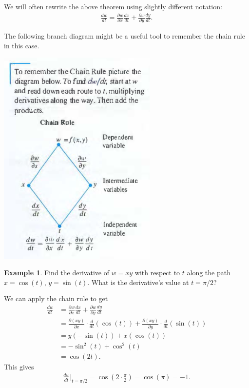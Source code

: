\documentclass[12pt, letter]{article}
\theoremstyle{plain}
\numberwithin{theorem}{section}
\theoremstyle{definition}
\newtheorem{example}[theorem]{Example}
\begin{document}
\bigskip

We will often rewrite the above theorem using slightly different notation:
\begin{align*}
\frac{dw}{dt} = \frac{\partial w}{\partial x} \frac{dx}{dt} + \frac{\partial w}{\partial y} \frac{dy}{dt}.
\end{align*}

\bigskip

The following branch diagram might be a useful tool to remember the chain rule in this case.

\bigskip

\begin{center}
\includegraphics[scale=0.6]{m2_f5}
\end{center}

\bigskip

\hrulefill

\bigskip

\begin{example}
Find the derivative of $w=xy$ with respect to $t$ along the path $x=\cos(t)$, $y=\sin(t)$. What is the derivative's value at $t=\pi/2$?

\smallskip

We can apply the chain rule to get
\begin{align*}
\frac{dw}{dt} &= \frac{\partial w}{\partial x} \frac{dx}{dt} + \frac{\partial w}{\partial y} \frac{dy}{dt}\\
&= \frac{\partial (xy)}{\partial x} \cdot \frac{d}{dt}(\cos(t))+\frac{\partial (xy)}{\partial y} \cdot \frac{d}{dt} (\sin(t))\\
&= y(-\sin(t)) + x(\cos(t))\\
&= -\sin^2(t) + \cos^2(t)\\
&= \cos(2t).
\end{align*}
This gives
\begin{align*}
\frac{dw}{dt} \bigg\rvert_{t=\pi/2} = \cos\left(2\cdot\frac{\pi}{2}\right) = \cos(\pi) = -1.
\end{align*}
\end{example}
\end{document}
